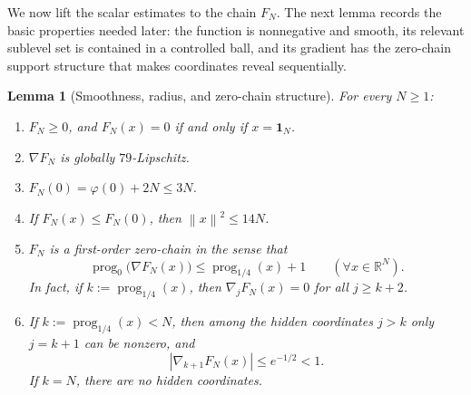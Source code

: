 \documentclass[11pt]{article}
\newtheorem{lemma}[theorem]{Lemma}
\newcommand{\R}{\mathbb{R}}
\newcommand{\norm}[1]{\left\lVert #1\right\rVert}
\newcommand{\prog}{\operatorname{prog}}
\newcommand{\one}{\mathbf{1}}
\begin{document}
We now lift the scalar estimates to the chain \(F_N\).  The next lemma records the basic properties needed later: the
function is nonnegative and smooth, its relevant sublevel set is contained in a controlled ball, and its gradient has
the zero-chain support structure that makes coordinates reveal sequentially.

\begin{lemma}[Smoothness, radius, and zero-chain structure]
\label{lem:FN-basic}
For every $N\ge 1$:
\begin{enumerate}[label=\arabic*.,leftmargin=1.5em]
    \item $F_N\ge 0$, and $F_N(x)=0$ if and only if $x=\one_N$.
    \item $\nabla F_N$ is globally $79$-Lipschitz.
    \item $F_N(0)=\varphi(0)+2N\le 3N$.
    \item If $F_N(x)\le F_N(0)$, then $\norm{x}^2\le 14N$.
    \item $F_N$ is a first-order zero-chain in the sense that
    \[
    \prog_0\bigl(\nabla F_N(x)\bigr)\le \prog_{1/4}(x)+1
    \qquad
    (\forall x\in\R^N).
    \]
    In fact, if $k:=\prog_{1/4}(x)$, then $\nabla_j F_N(x)=0$ for all $j\ge k+2$.
    \item If $k:=\prog_{1/4}(x)<N$, then among the hidden coordinates $j>k$ only $j=k+1$ can be nonzero, and
    \[
    |\nabla_{k+1}F_N(x)|\le e^{-1/2}<1.
    \]
    If \(k=N\), there are no hidden coordinates.
\end{enumerate}
\end{lemma}
\end{document}
